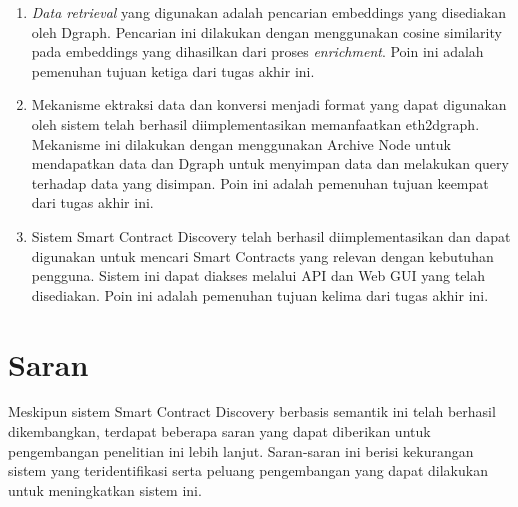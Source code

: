 \begin{enumerate}
	\item \textit{Data retrieval} yang digunakan adalah pencarian embeddings yang disediakan oleh Dgraph. Pencarian ini dilakukan dengan menggunakan cosine similarity pada embeddings yang dihasilkan dari proses \textit{enrichment}. Poin ini adalah pemenuhan tujuan ketiga dari tugas akhir ini.
	\item Mekanisme ektraksi data dan konversi menjadi format yang dapat digunakan oleh sistem telah berhasil diimplementasikan memanfaatkan eth2dgraph. Mekanisme ini dilakukan dengan menggunakan Archive Node untuk mendapatkan data dan Dgraph untuk menyimpan data dan melakukan query terhadap data yang disimpan. Poin ini adalah pemenuhan tujuan keempat dari tugas akhir ini.
	\item Sistem Smart Contract Discovery telah berhasil diimplementasikan dan dapat digunakan untuk mencari Smart Contracts yang relevan dengan kebutuhan pengguna. Sistem ini dapat diakses melalui API dan Web GUI yang telah disediakan. Poin ini adalah pemenuhan tujuan kelima dari tugas akhir ini.
\end{enumerate}

\section{Saran}
Meskipun sistem Smart Contract Discovery berbasis semantik ini telah berhasil dikembangkan, terdapat beberapa saran yang dapat diberikan untuk pengembangan penelitian ini lebih lanjut. Saran-saran ini berisi kekurangan sistem yang teridentifikasi serta peluang pengembangan yang dapat dilakukan untuk meningkatkan sistem ini.

